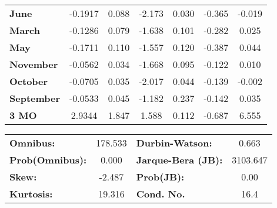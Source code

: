 \begin{center}
\begin{tabular}{lcccccc}
\textbf{June}      &      -0.1917  &        0.088     &    -2.173  &         0.030        &       -0.365    &       -0.019     \\
\textbf{March}     &      -0.1286  &        0.079     &    -1.638  &         0.101        &       -0.282    &        0.025     \\
\textbf{May}       &      -0.1711  &        0.110     &    -1.557  &         0.120        &       -0.387    &        0.044     \\
\textbf{November}  &      -0.0562  &        0.034     &    -1.668  &         0.095        &       -0.122    &        0.010     \\
\textbf{October}   &      -0.0705  &        0.035     &    -2.017  &         0.044        &       -0.139    &       -0.002     \\
\textbf{September} &      -0.0533  &        0.045     &    -1.182  &         0.237        &       -0.142    &        0.035     \\
\textbf{3 MO}      &       2.9344  &        1.847     &     1.588  &         0.112        &       -0.687    &        6.555     \\
\bottomrule
\end{tabular}
\begin{tabular}{lclc}
\textbf{Omnibus:}       & 178.533 & \textbf{  Durbin-Watson:     } &    0.663  \\
\textbf{Prob(Omnibus):} &   0.000 & \textbf{  Jarque-Bera (JB):  } & 3103.647  \\
\textbf{Skew:}          &  -2.487 & \textbf{  Prob(JB):          } &     0.00  \\
\textbf{Kurtosis:}      &  19.316 & \textbf{  Cond. No.          } &     16.4  \\
\bottomrule
\end{tabular}
\end{center}

